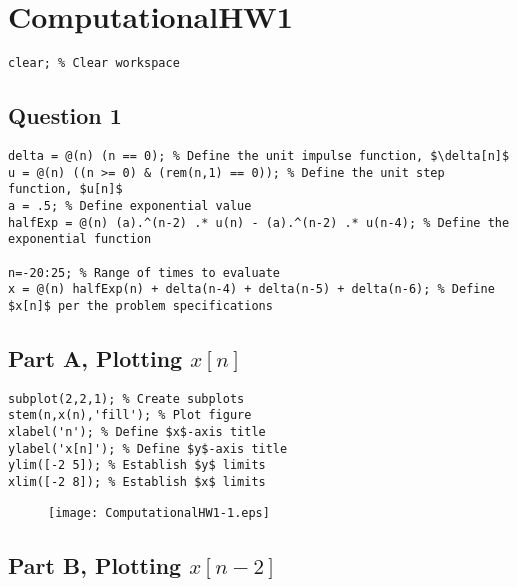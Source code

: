 \documentclass[10pt]{article}
\begin{document}
{\Huge\section*{ComputationalHW1}}

\tableofcontents
\vspace*{4em}

\newpage

\begin{lstlisting}
clear; % Clear workspace
\end{lstlisting}


{}
\subsection*{Question 1}

\begin{lstlisting}
delta = @(n) (n == 0); % Define the unit impulse function, $\delta[n]$
u = @(n) ((n >= 0) & (rem(n,1) == 0)); % Define the unit step function, $u[n]$
a = .5; % Define exponential value
halfExp = @(n) (a).^(n-2) .* u(n) - (a).^(n-2) .* u(n-4); % Define the exponential function

n=-20:25; % Range of times to evaluate
x = @(n) halfExp(n) + delta(n-4) + delta(n-5) + delta(n-6); % Define $x[n]$ per the problem specifications
\end{lstlisting}


{}
\subsection*{Part A, Plotting $x[n]$}

\begin{lstlisting}
subplot(2,2,1); % Create subplots
stem(n,x(n),'fill'); % Plot figure
xlabel('n'); % Define $x$-axis title
ylabel('x[n]'); % Define $y$-axis title
ylim([-2 5]); % Establish $y$ limits
xlim([-2 8]); % Establish $x$ limits
\end{lstlisting}
\begin{figure}[H]
\texttt{[image: ComputationalHW1-1.eps]}
\end{figure}


{}
\subsection*{Part B, Plotting $x[n-2]$}
\end{document}
